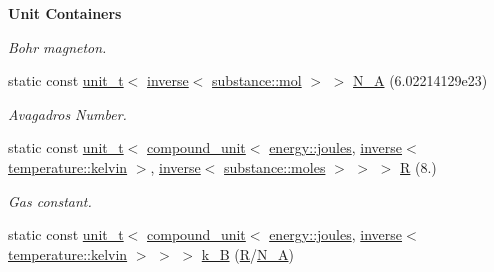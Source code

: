 \begin{Indent}{\bf Unit Containers}
\begin{DoxyCompactItemize}
\begin{DoxyCompactList}\small\item\em Bohr magneton. \end{DoxyCompactList}\item 
\hypertarget{namespaceunits_1_1constants_a6d9921df1f5ab3228cbd9a923677f73e}{}static const \hyperlink{classunits_1_1unit__t}{unit\+\_\+t}$<$ \hyperlink{group___unit_manipulators_gaacc539ef162e24b260d023d3ff949b57}{inverse}$<$ \hyperlink{structunits_1_1unit}{substance\+::mol} $>$ $>$ \hyperlink{namespaceunits_1_1constants_a6d9921df1f5ab3228cbd9a923677f73e}{N\+\_\+\+A} (6.\+02214129e23)\label{namespaceunits_1_1constants_a6d9921df1f5ab3228cbd9a923677f73e}

\begin{DoxyCompactList}\small\item\em Avagadro\textquotesingle{}s Number. \end{DoxyCompactList}\item 
\hypertarget{namespaceunits_1_1constants_a2ed026806f880c58a207ebac55ba2453}{}static const \hyperlink{classunits_1_1unit__t}{unit\+\_\+t}$<$ \hyperlink{group___unit_types_ga9c3f6f077dc894620e1ed8358442a8f1}{compound\+\_\+unit}$<$ \hyperlink{structunits_1_1unit}{energy\+::joules}, \hyperlink{group___unit_manipulators_gaacc539ef162e24b260d023d3ff949b57}{inverse}$<$ \hyperlink{structunits_1_1unit}{temperature\+::kelvin} $>$, \hyperlink{group___unit_manipulators_gaacc539ef162e24b260d023d3ff949b57}{inverse}$<$ \hyperlink{structunits_1_1unit}{substance\+::moles} $>$ $>$ $>$ \hyperlink{namespaceunits_1_1constants_a2ed026806f880c58a207ebac55ba2453}{R} (8.)\label{namespaceunits_1_1constants_a2ed026806f880c58a207ebac55ba2453}

\begin{DoxyCompactList}\small\item\em Gas constant. \end{DoxyCompactList}\item 
\hypertarget{namespaceunits_1_1constants_ab338b07c3a371446997041830d8cfda6}{}static const \hyperlink{classunits_1_1unit__t}{unit\+\_\+t}$<$ \hyperlink{group___unit_types_ga9c3f6f077dc894620e1ed8358442a8f1}{compound\+\_\+unit}$<$ \hyperlink{structunits_1_1unit}{energy\+::joules}, \hyperlink{group___unit_manipulators_gaacc539ef162e24b260d023d3ff949b57}{inverse}$<$ \hyperlink{structunits_1_1unit}{temperature\+::kelvin} $>$ $>$ $>$ \hyperlink{namespaceunits_1_1constants_ab338b07c3a371446997041830d8cfda6}{k\+\_\+\+B} (\hyperlink{namespaceunits_1_1constants_a2ed026806f880c58a207ebac55ba2453}{R}/\hyperlink{namespaceunits_1_1constants_a6d9921df1f5ab3228cbd9a923677f73e}{N\+\_\+\+A})\label{namespaceunits_1_1constants_ab338b07c3a371446997041830d8cfda6}


\end{DoxyCompactItemize}
\end{Indent}
